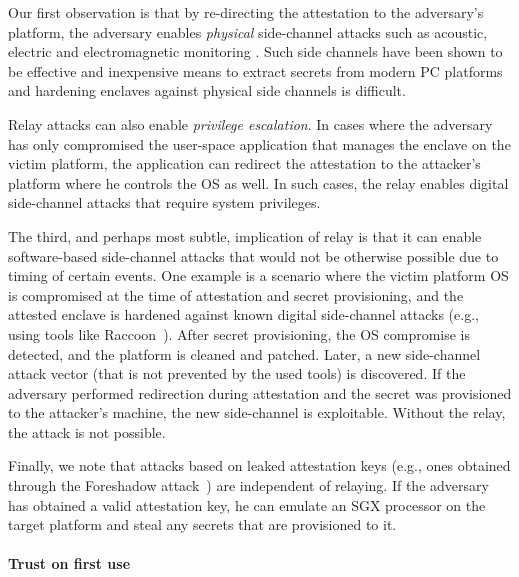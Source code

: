 
Our first observation is that by re-directing the attestation to the adversary's platform, the adversary enables \emph{physical} side-channel attacks such as acoustic, electric and electromagnetic monitoring . Such side channels have been shown to be effective and inexpensive means to extract secrets from modern PC platforms~\cite{genkin2016physical} and hardening enclaves against physical side channels is difficult. 

Relay attacks can also enable \emph{privilege escalation}. In cases where the adversary has only compromised the user-space application that manages the enclave on the victim platform, the application can redirect the attestation to the attacker's platform where he controls the OS as well. In such cases, the relay enables digital side-channel attacks that require system privileges.

The third, and perhaps most subtle, implication of relay is that it can enable software-based side-channel attacks that would not be otherwise possible due to timing of certain events. One example is a scenario where the victim platform OS is compromised at the time of attestation and secret provisioning, and the attested enclave is hardened against known digital side-channel attacks (e.g., using tools like Raccoon~\cite{raccoon}). After secret provisioning, the OS compromise is detected, and the platform is cleaned and patched. Later, a new side-channel attack vector (that is not prevented by the used tools) is discovered. If the adversary performed redirection during attestation and the secret was provisioned to the attacker's machine, the new side-channel is exploitable. Without the relay, the attack is not possible. 

Finally, we note that attacks based on leaked attestation keys (e.g., ones obtained through the Foreshadow attack~\cite{van2018foreshadow}) are independent of relaying. If the adversary has obtained a valid attestation key, he can emulate an SGX processor on the target platform and steal any secrets that are provisioned to it.


\paragraph{Trust on first use}

